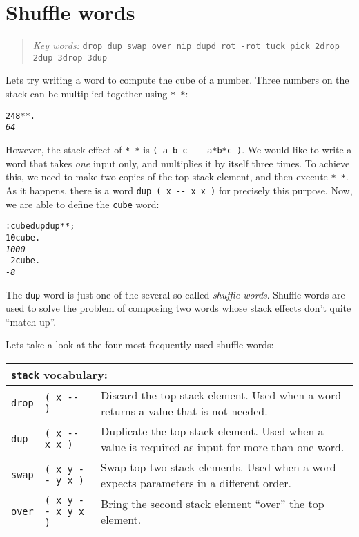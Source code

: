 \documentclass[english]{book}
\newcommand{\chapkeywords}[1]{{\parbox{10cm}{\begin{minipage}[b]{10cm}
\begin{quote}
\emph{Key words:} \texttt{#1}
\end{quote}
\end{minipage}}}}
\newcommand{\wordtable}[1]{{
\begin{tabularx}{12cm}{|l l X|}
#1
\hline
\end{tabularx}}}
\newcommand{\tabvocab}[1]{
\hline
\multicolumn{3}{|l|}{
\rule[-2mm]{0mm}{6mm}
\texttt{#1} vocabulary:}
\\
\hline
}
\begin{document}
\section{Shuffle words}

\chapkeywords{drop dup swap over nip dupd rot -rot tuck pick 2drop 2dup 3drop 3dup}

Lets try writing a word to compute the cube of a number. 
Three numbers on the stack can be multiplied together using \texttt{{*}
{*}}:

\begin{alltt}
2 4 8 {*} {*} .
\emph{64}
\end{alltt}

However, the stack effect of \texttt{{*} {*}} is \texttt{( a b c -{}-
a{*}b{*}c )}. We would like to write a word that takes \emph{one} input
only, and multiplies it by itself three times. To achieve this, we need to make two copies of the top stack element, and then execute \texttt{{*} {*}}. As it happens, there is a word \texttt{dup ( x -{}-
x x )} for precisely this purpose. Now, we are able to define the
\texttt{cube} word:

\begin{alltt}
: cube dup dup {*} {*} ;
10 cube .
\emph{1000}
-2 cube .
\emph{-8}
\end{alltt}

The \texttt{dup} word is just one of the several so-called \emph{shuffle words}. Shuffle words are used to solve the problem of composing two words whose stack effects don't quite {}``match up''.

Lets take a look at the four most-frequently used shuffle words:

\wordtable{
\tabvocab{stack}
\texttt{drop}&
\texttt{( x -{}- )}&
Discard the top stack element. Used when
a word returns a value that is not needed.\\
\texttt{dup}&
\texttt{( x -{}- x x )}&
Duplicate the top stack element. Used
when a value is required as input for more than one word.\\
\texttt{swap}&
\texttt{( x y -{}- y x )}&
Swap top two stack elements. Used when
a word expects parameters in a different order.\\
\texttt{over}&
\texttt{( x y -{}- x y x )}&
Bring the second stack element {}``over''
the top element.\\}
\end{document}
